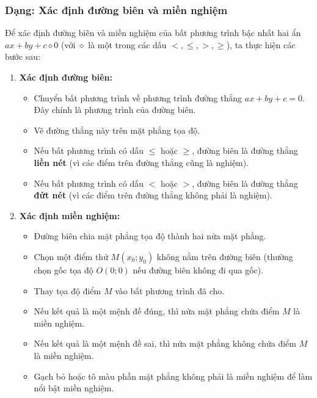 \subsubsection{Dạng: Xác định đường biên và miền nghiệm}
\begin{phuongphap}
Để xác định đường biên và miền nghiệm của bất phương trình bậc nhất hai ẩn $ax+by+c \diamond 0$ (với $\diamond$ là một trong các dấu $<, \le, >, \ge$), ta thực hiện các bước sau:
\begin{enumerate}
    \item \textbf{Xác định đường biên:}
    \begin{itemize}
        \item Chuyển bất phương trình về phương trình đường thẳng $ax+by+c=0$. Đây chính là phương trình của đường biên.
        \item Vẽ đường thẳng này trên mặt phẳng tọa độ.
        \item Nếu bất phương trình có dấu $\le$ hoặc $\ge$, đường biên là đường thẳng \textbf{liền nét} (vì các điểm trên đường thẳng cũng là nghiệm).
        \item Nếu bất phương trình có dấu $<$ hoặc $>$, đường biên là đường thẳng \textbf{đứt nét} (vì các điểm trên đường thẳng không phải là nghiệm).
    \end{itemize}
    \item \textbf{Xác định miền nghiệm:}
    \begin{itemize}
        \item Đường biên chia mặt phẳng tọa độ thành hai nửa mặt phẳng.
        \item Chọn một điểm thử $M(x_0; y_0)$ không nằm trên đường biên (thường chọn gốc tọa độ $O(0;0)$ nếu đường biên không đi qua gốc).
        \item Thay tọa độ điểm $M$ vào bất phương trình đã cho.
        \item Nếu kết quả là một mệnh đề đúng, thì nửa mặt phẳng chứa điểm $M$ là miền nghiệm.
        \item Nếu kết quả là một mệnh đề sai, thì nửa mặt phẳng không chứa điểm $M$ là miền nghiệm.
        \item Gạch bỏ hoặc tô màu phần mặt phẳng không phải là miền nghiệm để làm nổi bật miền nghiệm.
    \end{itemize}
\end{enumerate}
\end{phuongphap}
